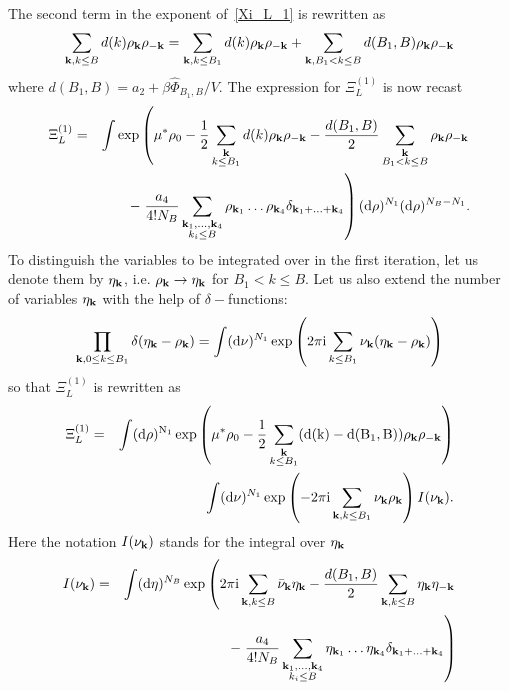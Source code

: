 The second term in the exponent of~\eqref{Xi_L_1} is rewritten as
\begin{equation*}
	\sum_{\substack{\vb k, k \leq B}} d(k) \rho_{\vb k} \rho_{-\vb k} 
	= 
	\sum_{\substack{\vb k, k \leq B_1}} d(k) \rho_{\vb k} \rho_{-\vb k}
	+
	\sum_{\substack{\vb k, B_1 < k \leq B}} d(B_1, B) \rho_{\vb k} \rho_{-\vb k}
\end{equation*}
where $d(B_1, B) = a_2 + \beta\hat{\Phi}_{B_1, B}/V$.
The expression for $\Xi_L^{(1)}$ is now recast
\begin{eqnarray*}
	\Xi_L^{(1)} &=& 
	\int \exp\left(
	\mu^* \rho_0 - \frac{1}{2} \sum_{\substack{\vb k \\ k \leq B_1}} d(k) \rho_{\vb k} \rho_{-\vb k}
	- \frac{d(B_1, B)}{2} \sum_{\substack{\vb k \\ B_1 < k \leq B}} \rho_{\vb k} \rho_{-\vb k}  
	\right.
	\\
	&& -\left. \frac{a_4}{4! N_B} \sum_{\substack{\vb k_1, \dotsc, \vb k_4 \\ k_i \leq B}} \rho_{\vb k_1} \dotsc \rho_{\vb k_4} \delta_{\vb{k}_1 + \dotsc + \vb{k}_4} \right) 
	({\rm d} \rho)^{N_1} ({\rm d} \rho)^{N_B - N_1}
	\nonumber.
\end{eqnarray*}
To distinguish the variables to be integrated over in the first iteration, let us denote them by $\eta_{\vb k}$, i.e. $\rho_{\vb k} \rightarrow \eta_{\vb k}$ for $B_1 < k \leq B$. Let us also extend the number of variables $\eta_{\vb k}$ with the help of $\delta-$functions:
\begin{equation*}
	\prod_{\vb{k}, 0\leq k \leq B_1}\delta(\eta_{\vb k}-\rho_{\vb k})
	= \int ({\rm d}\nu)^{N_1}\exp \left(2\pi{\rm i}\sum_{k\leq B_1}\nu_{\vb k}(\eta_{\vb k}-\rho_{\vb k})\right)
\end{equation*}
so that $\Xi_L^{(1)}$ is rewritten as 
\begin{eqnarray*}
	\Xi_L^{(1)} &=& 
	\int (\rm{d} \rho)^{N_1} \exp 
	\left(
		\mu^* \rho_0 - \frac{1}{2} \sum_{\substack{\vb k \\ k \leq B_1}} (d(k) - d(B_1, B) ) \rho_{\vb k} \rho_{-\vb k}
	\right)
	\\
	&&  \int ({\rm d}\nu)^{N_1} \exp \left(-2\pi{\rm i}\sum_{\vb k, k \leq B_1} \nu_{\vb k}\rho_{\vb k}\right)
	I(\nu_{\vb k}).
\end{eqnarray*}
Here the notation $I(\nu_{\vb k})$ stands for the integral over $\eta_{\vb k}$
\begin{eqnarray*}
	I(\nu_{\vb k}) & = & \int ({\rm d} \eta)^{N_B} \exp
	\left( 2\pi{\rm i} \sum_{\vb k, k \leq B} \bar{\nu}_{\vb k} \eta_{\vb k} - \frac{d(B_1, B)}{2} \sum_{\vb k, k \leq B} \eta_{\vb k} \eta_{-\vb k}
	\right.
	\\
	&& - \left. \frac{a_4}{4! N_B} \sum_{\substack{\vb k_1, \dotsc, \vb k_4 \\ k_i \leq B}} \eta_{\vb k_1} \dotsc \eta_{\vb k_4} \delta_{\vb{k}_1 + \dotsc + \vb{k}_4} \right)
\end{eqnarray*}

